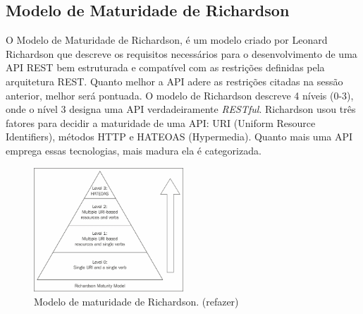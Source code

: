 
\subsection{Modelo de Maturidade de Richardson}



O Modelo de Maturidade de Richardson, é um modelo criado por Leonard Richardson que descreve os requisitos necessários para o desenvolvimento de uma API REST bem estruturada e compatível com as restrições definidas pela arquitetura REST. Quanto melhor a API adere as restrições citadas na sessão anterior, melhor será pontuada. O  modelo de Richardson descreve 4 níveis (0-3), onde o nível 3 designa uma API verdadeiramente \textit{RESTful}. Richardson usou três fatores para decidir a maturidade de uma API: URI (Uniform Resource Identifiers), métodos HTTP e HATEOAS (Hypermedia). Quanto mais uma API emprega essas tecnologias, mais madura ela é categorizada.

\begin{figure}[htbp]
\centering
\includegraphics[width=0.5\textwidth]{figuras/rest-maturity-model.jpg}
\caption{Modelo de maturidade de Richardson. (refazer)}
\label{fig:rest-maturity-model}
\end{figure}

